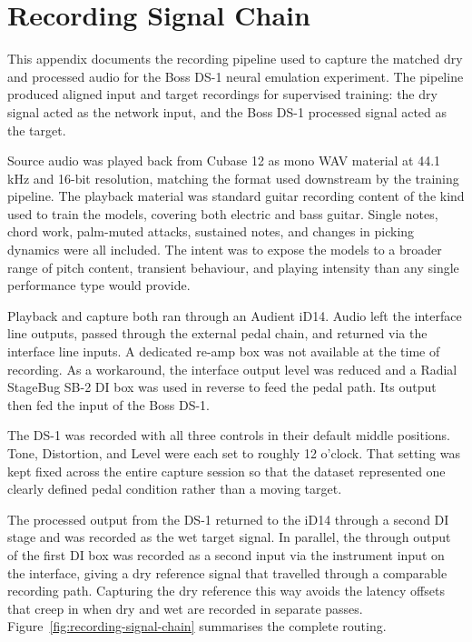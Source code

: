 \chapter{Recording Signal Chain}
\label{appendix:recording-chain}

This appendix documents the recording pipeline used to capture the matched dry and processed audio for the Boss DS-1 neural emulation experiment. The pipeline produced aligned input and target recordings for supervised training: the dry signal acted as the network input, and the Boss DS-1 processed signal acted as the target.

Source audio was played back from Cubase 12 as mono WAV material at 44.1 kHz and 16-bit resolution, matching the format used downstream by the training pipeline. The playback material was standard guitar recording content of the kind used to train the models, covering both electric and bass guitar. Single notes, chord work, palm-muted attacks, sustained notes, and changes in picking dynamics were all included. The intent was to expose the models to a broader range of pitch content, transient behaviour, and playing intensity than any single performance type would provide.

Playback and capture both ran through an Audient iD14. Audio left the interface line outputs, passed through the external pedal chain, and returned via the interface line inputs. A dedicated re-amp box was not available at the time of recording. As a workaround, the interface output level was reduced and a Radial StageBug SB-2 DI box was used in reverse to feed the pedal path. Its output then fed the input of the Boss DS-1.

The DS-1 was recorded with all three controls in their default middle positions. Tone, Distortion, and Level were each set to roughly 12 o'clock. That setting was kept fixed across the entire capture session so that the dataset represented one clearly defined pedal condition rather than a moving target.

The processed output from the DS-1 returned to the iD14 through a second DI stage and was recorded as the wet target signal. In parallel, the through output of the first DI box was recorded as a second input via the instrument input on the interface, giving a dry reference signal that travelled through a comparable recording path. Capturing the dry reference this way avoids the latency offsets that creep in when dry and wet are recorded in separate passes. Figure~\ref{fig:recording-signal-chain} summarises the complete routing.

